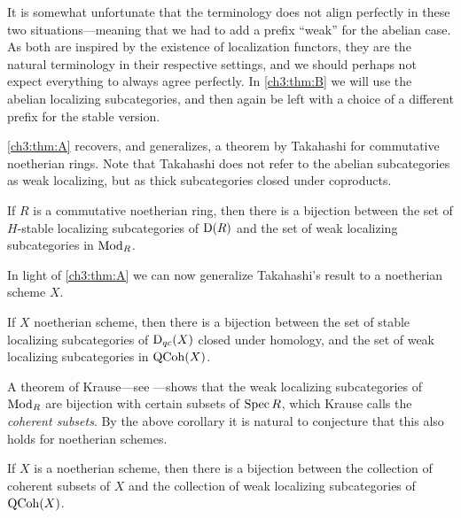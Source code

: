 \begin{remark}
    It is somewhat unfortunate that the terminology does not align perfectly in these two situations---meaning that we had to add a prefix ``weak'' for the abelian case. As both are inspired by the existence of localization functors, they are the natural terminology in their respective settings, and we should perhaps not expect everything to always agree perfectly. In \cref{ch3:thm:B} we will use the abelian localizing subcategories, and then again be left with a choice of a different prefix for the stable version. 
\end{remark}

\cref{ch3:thm:A} recovers, and generalizes, a theorem by Takahashi for commutative noetherian rings. Note that Takahashi does not refer to the abelian subcategories as weak localizing, but as thick subcategories closed under coproducts. 

\begin{corollary}
    \label{ch3:cor:takahashi-weak-localizing}
    If $R$ is a commutative noetherian ring, then there is a bijection between the set of $H$-stable localizing subcategories of $\mathrm{D}(R)$ and the set of weak localizing subcategories in $\mathrm{Mod}_R$. 
\end{corollary}

In light of \cref{ch3:thm:A} we can now generalize Takahashi's result to a noetherian scheme $X$. 

\begin{corollary}
    \label{ch3:cor:noetherian-scheme-weak-localizing}
    If $X$ noetherian scheme, then there is a bijection between the set of stable localizing subcategories of $\mathrm{D}_{qc}(X)$ closed under homology, and the set of weak localizing subcategories in $\operatorname{QCoh}(X)$. 
\end{corollary}

A theorem of Krause---see \cite[3.1]{krause_2008}---shows that the weak localizing subcategories of $\mathrm{Mod}_R$ are bijection with certain subsets of $\operatorname{Spec} R$, which Krause calls the \emph{coherent subsets}. By the above corollary it is natural to conjecture that this also holds for noetherian schemes. 

\begin{conjecture}
    \label{ch3:conj:coherent-noetherian-scheme}
    If $X$ is a noetherian scheme, then there is a bijection between the collection of coherent subsets of $X$ and the collection of weak localizing subcategories of $\operatorname{QCoh}(X)$. 
\end{conjecture}

